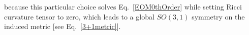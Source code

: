 \documentclass[twocolumn,
  showpacs,showkeys,prd,superscriptaddress]{revtex4-1}
\begin{document}
because this particular choice solves Eq.~\eqref{EOM0thOrder} while setting Ricci curvature tensor to zero, which leads to a global $SO(3,1)$ symmetry on the induced metric [see Eq.~\eqref{3+1metric}].



\end{document}
